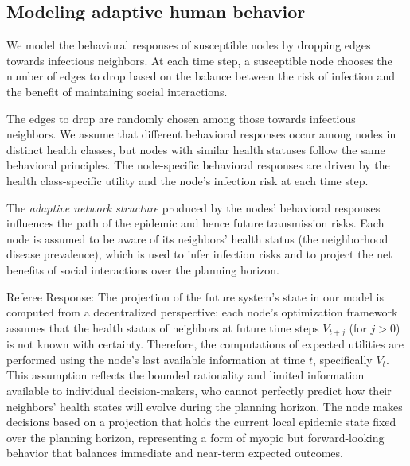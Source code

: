 \documentclass[9pt,twocolumn,twoside]{pnas-new}
\newcommand{\green}[1]{{\textcolor{green!50!black}{#1}}}
\begin{document}


\subsection*{Modeling adaptive human behavior}

We model the behavioral responses of susceptible nodes by dropping edges towards infectious neighbors. At each time step, a susceptible node chooses the number of edges to drop based on the balance between the risk of infection and the benefit of maintaining social interactions.

The edges to drop are randomly chosen among those towards infectious neighbors. We assume that different behavioral responses occur among nodes in distinct health classes, but nodes with similar health statuses follow the same behavioral principles. The node-specific behavioral responses are driven by the health class-specific utility and the node's infection risk at each time step.

The {\em adaptive network structure} produced by the nodes' behavioral responses influences the path of the epidemic and hence future transmission risks. Each node is assumed to be aware of its neighbors' health status (the neighborhood disease prevalence), which is used to infer infection risks and to project the net benefits of social interactions over the planning horizon.

\green{Referee Response: The projection of the future system's state in our model is computed from a decentralized perspective: each node's optimization framework assumes that the health status of neighbors at future time steps $V_{t+j}$ (for $j>0$) is not known with certainty. Therefore, the computations of expected utilities are performed using the node's last available information at time $t$, specifically $V_t$. This assumption reflects the bounded rationality and limited information available to individual decision-makers, who cannot perfectly predict how their neighbors' health states will evolve during the planning horizon. The node makes decisions based on a projection that holds the current local epidemic state fixed over the planning horizon, representing a form of myopic but forward-looking behavior that balances immediate and near-term expected outcomes.}
\end{document}
